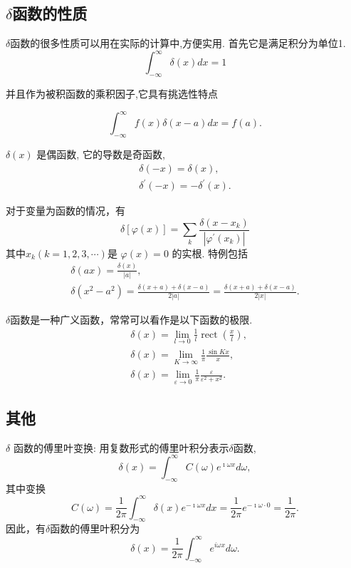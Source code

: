 \subsection{$\delta$函数的性质}
$\delta$函数的很多性质可以用在实际的计算中,方便实用. 首先它是满足积分为单位1.
$$
\int_{-\infty}^{\infty} \delta(x) d x=1
$$

并且作为被积函数的乘积因子,它具有挑选性特点

$$
\int_{-\infty}^{\infty} f(x) \delta(x-a) d x=f(a).
$$

$\delta(x)$ 是偶函数, 它的导数是奇函数,
$$
\begin{gathered}
\delta(-x)=\delta(x), \\
\delta^{\prime}(-x)=-\delta^{\prime}(x) .
\end{gathered}
$$

对于变量为函数的情况，有
\begin{equation}
    \delta[\varphi(x)]=\sum_k \frac{\delta\left(x-x_k\right)}{\left|\varphi^{\prime}\left(x_k\right)\right|}
\end{equation}
其中$x_k(k=1,2,3, \cdots)$是
$\varphi(x)=0$ 的实根.
特例包括
\begin{equation}
    \begin{gathered}
    \delta(a x)=\frac{\delta(x)}{|a|}, \\
    \delta\left(x^2-a^2\right)=\frac{\delta(x+a)+\delta(x-a)}{2|a|}=\frac{\delta(x+a)+\delta(x-a)}{2|x|} .
    \end{gathered}
\end{equation}

$\delta$函数是一种广义函数，常常可以看作是以下函数的极限.
\begin{equation}
    \begin{aligned}
    & \delta(x)=\lim _{l \rightarrow 0} \frac{1}{l} \operatorname{rect}\left(\frac{x}{l}\right), \\
    & \delta(x)=\lim _{K \rightarrow \infty} \frac{1}{\pi} \frac{\sin K x}{x}, \\
    & \delta(x)=\lim _{\varepsilon \rightarrow 0} \frac{1}{\pi} \frac{\varepsilon}{\varepsilon^2+x^2} .
    \end{aligned}
\end{equation}

\subsection{其他}
$\delta$ 函数的傅里叶变换: 用复数形式的傅里叶积分表示$\delta$函数,
\begin{equation}
\delta(x)=\int_{-\infty}^{\infty} C(\omega) e^{\imath\omega x} d \omega,
\end{equation}
其中变换
$$
C(\omega)=\frac{1}{2 \pi} \int_{-\infty}^{\infty} \delta(x) e^{-\imath\omega x} d x=\frac{1}{2 \pi} e^{-\imath\omega \cdot 0}=\frac{1}{2 \pi} .
$$
因此，有$\delta$函数的傅里叶积分为
\begin{equation}
\delta(x)=\frac{1}{2 \pi} \int_{-\infty}^{\infty} e^{i \omega x} d \omega .
\end{equation}

